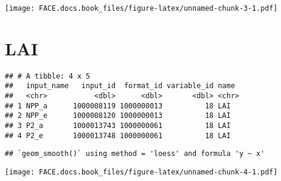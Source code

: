 \documentclass[]{book}
\begin{document}
\texttt{[image: FACE.docs.book\_files/figure-latex/unnamed-chunk-3-1.pdf]}

\hypertarget{lai}{%
\section*{LAI}\label{lai}}

\begin{verbatim}
## # A tibble: 4 x 5
##   input_name   input_id  format_id variable_id name 
##   <chr>           <dbl>      <dbl>       <dbl> <chr>
## 1 NPP_a      1000008119 1000000013          18 LAI  
## 2 NPP_e      1000008120 1000000013          18 LAI  
## 3 P2_a       1000013743 1000000061          18 LAI  
## 4 P2_e       1000013748 1000000061          18 LAI
\end{verbatim}

\begin{verbatim}
## `geom_smooth()` using method = 'loess' and formula 'y ~ x'
\end{verbatim}

\texttt{[image: FACE.docs.book\_files/figure-latex/unnamed-chunk-4-1.pdf]}
\end{document}
